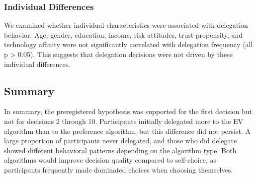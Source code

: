 \subsubsection{Individual Differences}

We examined whether individual characteristics were associated with delegation behavior. Age, gender, education, income, risk attitudes, trust propensity, and technology affinity were not significantly correlated with delegation frequency (all p > 0.05). This suggests that delegation decisions were not driven by these individual differences.

\subsection{Summary}

In summary, the preregistered hypothesis was supported for the first decision but not for decisions 2 through 10. Participants initially delegated more to the EV algorithm than to the preference algorithm, but this difference did not persist. A large proportion of participants never delegated, and those who did delegate showed different behavioral patterns depending on the algorithm type. Both algorithms would improve decision quality compared to self-choice, as participants frequently made dominated choices when choosing themselves.